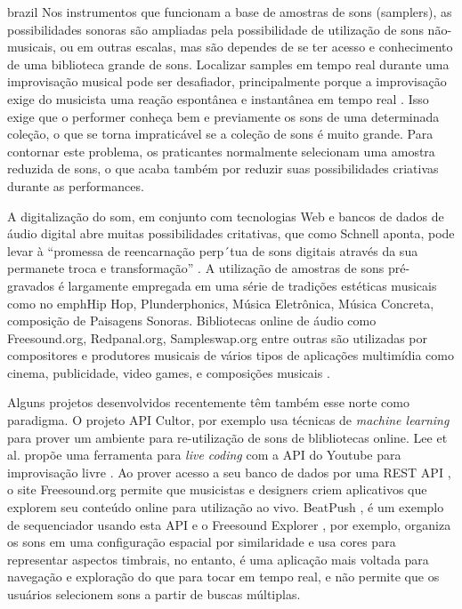 \begin{otherlanguage*}{brazil}
Nos instrumentos que funcionam a base de amostras de sons (samplers), as possibilidades sonoras são ampliadas pela possibilidade de utilização de sons não-musicais, ou em outras escalas, mas são dependes de se ter acesso e conhecimento de uma biblioteca grande de sons. Localizar samples em tempo real durante uma improvisação musical pode ser desafiador\cite{Xambo2018}, principalmente porque a improvisação exige do musicista uma reação espontânea e instantânea em tempo real \cite{canonne2011model}. Isso exige que o performer conheça bem e previamente os sons de uma determinada coleção, o que se torna impraticável se a coleção de sons é muito grande. Para contornar este problema, os praticantes normalmente selecionam uma amostra reduzida de sons, o que acaba também por reduzir suas possibilidades criativas durante as performances.

A digitalização do som, em conjunto com tecnologias Web e bancos de dados de áudio digital abre muitas possibilidades critativas, que como Schnell aponta, pode levar à ``promessa de reencarnação perp´tua de sons digitais através da sua permanete troca e transformação'' \cite{Schnell2013}. A utilização de amostras de sons pré-gravados é largamente empregada em uma série de tradições estéticas musicais como no emph{Hip Hop, Plunderphonics, Música Eletrônica, Música Concreta, composição de Paisagens Sonoras}. Bibliotecas online de áudio como Freesound.org, Redpanal.org, Sampleswap.org entre outras são utilizadas por compositores e produtores musicais de vários tipos de aplicações multimídia como cinema, publicidade, video games, e composições musicais \cite{Roma2013}. 

Alguns projetos desenvolvidos recentemente têm também esse norte como paradigma. O projeto API Cultor, por exemplo \cite{Ordiales2017} usa técnicas de \emph{machine learning} para prover um ambiente para re-utilização de sons de blibliotecas online. Lee et al. propõe uma ferramenta para \emph{live coding} com a API do Youtube para improvisação livre \cite{Lee}. Ao prover acesso a seu banco de dados por uma REST API \cite{Akkermans2011}, o site Freesound.org permite que musicistas e designers criem aplicativos que explorem seu conteúdo online para utilização ao vivo. BeatPush \cite{Feenstra2016}, é um exemplo de sequenciador usando esta API e o Freesound Explorer \cite{Font2016}, por exemplo, organiza os sons em uma configuração espacial por similaridade e usa cores para representar aspectos timbrais, no entanto, é uma aplicação mais voltada para navegação e exploração do que para tocar em tempo real, e não permite que os usuários selecionem sons a partir de buscas múltiplas. 



\end{otherlanguage*}
